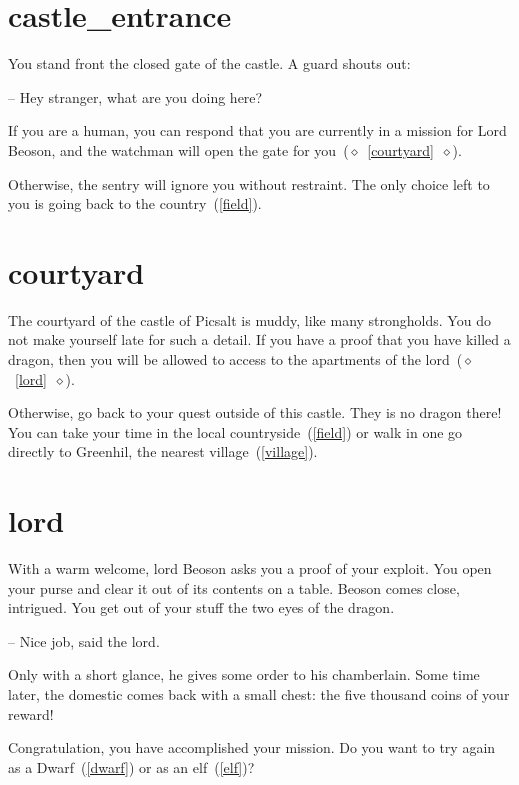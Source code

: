 \section{castle_entrance}

You stand front the closed gate of the castle. A guard shouts out:

-- Hey stranger, what are you doing here?

If you are a human, you can respond that you are currently in a mission for Lord
Beoson, and the watchman will open the gate for you~($\diamond$~\ref{courtyard}~$\diamond$).

Otherwise, the sentry will ignore you without restraint. The only choice
left to you is going back to the country~(\ref{field}).

\section{courtyard}

The courtyard of the castle of Picsalt is muddy, like many strongholds. You do
not make yourself late for such a detail. If you have a proof that you have
killed a dragon, then you will be allowed to access to the apartments of the
lord~($\diamond$~\ref{lord}~$\diamond$).

Otherwise, go back to your quest outside of this castle. They is no dragon
there! You can take your time in the local countryside~(\ref{field}) or walk in
one go directly to Greenhil, the nearest village~(\ref{village}).

\section{lord}

With a warm welcome, lord Beoson asks you a proof of your exploit.  You open
your purse and clear it out of its contents on a table. Beoson comes close,
intrigued. You get out of your stuff the two eyes of the dragon.

-- Nice job, said the lord.

Only with a short glance, he gives some order to his chamberlain. Some time
later, the domestic comes back with a small chest: the five thousand coins of
your reward!

\medbreak

Congratulation, you have accomplished your mission. Do you want to try again as a
Dwarf~(\ref{dwarf}) or as an elf~(\ref{elf})?
